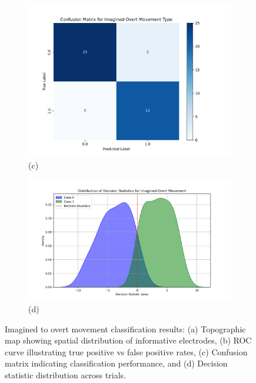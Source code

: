 \documentclass[
  letterpaper,
  DIV=11,
  numbers=noendperiod]{scrartcl}
\begin{document}
\begin{figure}
{\begin{figure}
\centering
\includegraphics[width=1\textwidth,height=\textheight]{figures/cross-validated-results/linear/imagined-overt-confusion-matrix.png}
\caption{(c)}\label{fig:imagined-overt-confusion-matrix}
\end{figure}

\begin{figure}
\centering
\includegraphics[width=1\textwidth,height=\textheight]{figures/cross-validated-results/linear/imagined-overt-decision-statistic.png}
\caption{(d)}\label{fig:imagined-overt-decision-statistic}
\end{figure}

}

\caption{\label{fig-imagined-overt-results}Imagined to overt movement
classification results: (a) Topographic map showing spatial distribution
of informative electrodes, (b) ROC curve illustrating true positive vs
false positive rates, (c) Confusion matrix indicating classification
performance, and (d) Decision statistic distribution across trials.}

\end{figure}%
\end{document}
